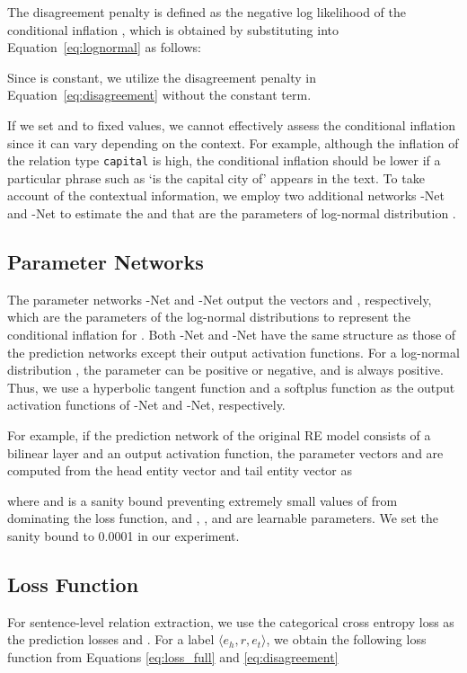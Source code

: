 \documentclass[11pt]{article}
\newcommand{\triple}[3]{\ensuremath{\langle #1,#2,#3\rangle}}
\newcommand{\munet}{-Net\xspace}
\newcommand{\sigmanet}{-Net\xspace}
\newcommand{\ehead}{e_{h}}
\newcommand{\etail}{e_{t}}
\newcommand{\relationt}[1]{\texttt{#1}}
\begin{document}
The disagreement penalty  is defined as the negative log likelihood of the conditional inflation , which is obtained by substituting  into Equation~\eqref{eq:lognormal} as follows:

Since  is constant, we utilize the disagreement penalty in Equation~\eqref{eq:disagreement} without the constant term.


If we set  and  to fixed values, we cannot effectively assess the conditional inflation since it can vary depending on the context.
For example, although the inflation of the relation type \relationt{capital} is high, the conditional inflation should be lower if a particular phrase such as `is the capital city of' appears in the text.
To take account of the contextual information,
we employ two additional networks \munet and \sigmanet to estimate the  and  that are the parameters of log-normal distribution .



\subsection{Parameter Networks}
The parameter networks \munet and \sigmanet output the vectors  and , respectively, which are
the parameters of the log-normal distributions to represent the conditional inflation for .
Both \munet and \sigmanet have the same structure as those of the prediction networks except their output activation functions.
For a log-normal distribution , the parameter  can be positive or negative, and  is always positive.
Thus, we use a hyperbolic tangent function and a softplus function \cite{dugas2001incorporating} as the output activation functions of \munet and \sigmanet, respectively.




For example, if the prediction network of the original RE model consists of a bilinear layer and an output activation function,
the parameter vectors  and  are computed from the head entity vector  and tail entity vector  as

where  and  is a sanity bound preventing extremely small values of  from dominating the loss function, and , ,  and  are learnable parameters.
We set the sanity bound  to 0.0001 in our experiment.



\subsection{Loss Function}
For sentence-level relation extraction, we use the categorical cross entropy loss as the prediction losses  and .
For a label \triple{\ehead}{r}{\etail}, we obtain the following loss function from Equations \eqref{eq:loss_full} and \eqref{eq:disagreement}
\end{document}
